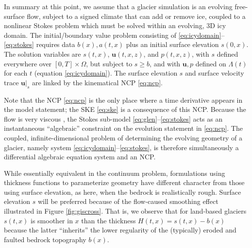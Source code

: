 \documentclass[hidelinks,onefignum,onetabnum,final]{siamart220329}  %
\newcommand{\bu}{\mathbf{u}}
\begin{document}
In summary at this point, we assume that a glacier simulation is an evolving free-surface flow, subject to a signed climate that can add or remove ice, coupled to a nonlinear Stokes problem which must be solved within an evolving, 3D icy domain.  The initial/boundary value problem consisting of \eqref{eq:icydomain}--\eqref{eq:stokes} requires data $b(x),a(t,x)$ plus an initial surface elevation $s(0,x)$.  The solution variables are $s(t,x)$, $\bu(t,x,z)$, and $p(t,x,z)$, with $s$ defined everywhere over $[0,T]\times \Omega$, but subject to $s \ge b$, and with $\bu,p$ defined on $\Lambda(t)$ for each $t$ (equation \eqref{eq:icydomain}).  The surface elevation $s$ and surface velocity trace $\bu|_s$ are linked by the kinematical NCP \eqref{eq:ncp}.

Note that the NCP \eqref{eq:ncp} is the only place where a time derivative appears in the model statement; the SKE \eqref{eq:ske} is a consequence of this NCP.  Because the flow is very viscous \cite{Acheson1990}, the Stokes sub-model \eqref{eq:glen}--\eqref{eq:stokes} acts as an instantaneous ``algebraic'' constraint on the evolution statement in \eqref{eq:ncp}.  The coupled, infinite-dimensional problem of determining the evolving geometry of a glacier, namely system \eqref{eq:icydomain}--\eqref{eq:stokes}, is therefore simultaneously a differential algebraic equation system \cite{AscherPetzold1998,LofgrenAhlkronaHelanow2022} and an NCP.

While essentially equivalent in the continuum problem, formulations using thickness functions to parameterize geometry have different character from those using surface elevation, as here, when the bedrock is realistically rough.  Surface elevation $s$ will be preferred because of the flow-caused smoothing effect illustrated in Figure \ref{fig:giscross}.  That is, we observe that for land-based glaciers $s(t,x)$ is smoother in $x$ than the thickness $H(t,x) = s(t,x)-b(x)$ because the latter ``inherits'' the lower regularity of the (typically) eroded and faulted bedrock topography $b(x)$.
\end{document}
